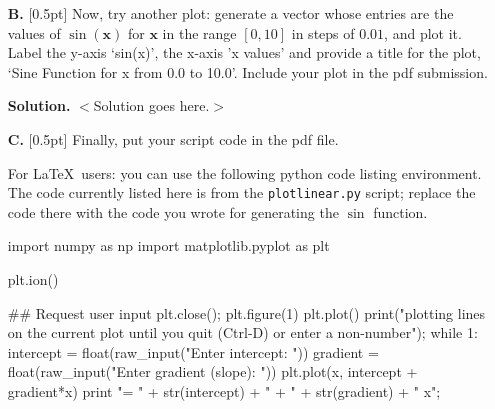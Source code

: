 \documentclass[10pt]{article}
\begin{document}
\begin{enumerate}
\begin{itemize}
{\bf Solution.} $<$Solution goes here.$>$


\item[{\bf B.}] [0.5pt] Now, try another plot: generate a vector whose entries are the values of $\sin(\mathbf{x})$ for $\mathbf{x}$ in the range $[0,10]$ in steps of $0.01$, and plot it.  Label the y-axis `sin(x)', the x-axis 'x values' and provide a title for the plot, `Sine Function for x from 0.0 to 10.0'.  Include your plot in the pdf submission.


{\bf Solution.} $<$Solution goes here.$>$

\item[{\bf C.}] [0.5pt] Finally, put your script code in the pdf file.  

For \LaTeX~users: you can use the following python code listing environment.  The code currently listed here is from the {\tt plotlinear.py} script; replace the code there with the code you wrote for generating the $\sin$ function.

\begin{python}[caption={Example Code Listing: portion of python {\tt plotlinear.py} script}, label=ex1]
import numpy as np
import matplotlib.pyplot as plt

plt.ion()

## Request user input
plt.close();
plt.figure(1)
plt.plot()
print("\nKeeps plotting lines on the current plot until you quit (Ctrl-D) or 
		enter a non-number");
while 1:
    intercept = float(raw_input("Enter intercept: "))
    gradient = float(raw_input("Enter gradient (slope): "))
    plt.plot(x, intercept + gradient*x)
    print "\ny = " + str(intercept) + " + " + str(gradient) + " x\n";
\end{python}


\end{itemize}
\end{enumerate}
\end{document}
